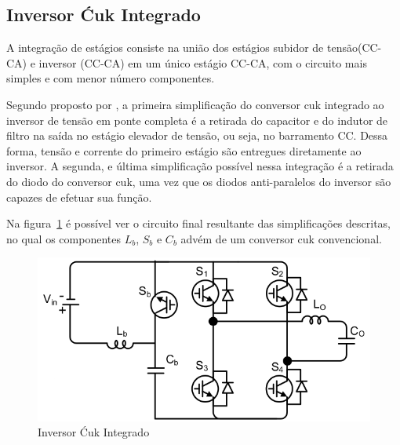 \documentclass[
	12pt,				%
	openany,
	onseside,
	a4paper,			%
	english,			%
	french,				%
	spanish,			%
	brazil,				%
	]{abntex2}
\begin{document}
\subsection{Inversor Ćuk Integrado}

A integração de estágios consiste na união dos estágios subidor de tensão(CC-CA) e inversor (CC-CA) em um único estágio CC-CA, com o circuito mais simples e com menor número componentes. 

Segundo proposto por , a primeira simplificação do conversor cuk integrado ao inversor de tensão em ponte completa é a retirada do capacitor e do indutor de filtro na saída no estágio elevador de tensão, ou seja, no barramento CC. Dessa forma, tensão e corrente do primeiro estágio são entregues diretamente ao inversor. A segunda, e última simplificação possível nessa integração é a retirada do diodo do conversor cuk, uma vez que os diodos anti-paralelos do inversor são capazes de efetuar sua função.

Na figura~\ref{fig:integ_cuk_circ} é possível ver o circuito final resultante das simplificações descritas, no qual os componentes $L_b$, $S_b$ e $C_b$ advém de um conversor cuk convencional. 


\begin{figure}[H]
	\begin{center}
		\includegraphics[width=0.65 \linewidth]{integ_cuk_circ}
		\caption{Inversor Ćuk Integrado \cite{LUIGI_int_top}}
		\label{fig:integ_cuk_circ}
	\end{center}
\end{figure}

\end{document}
